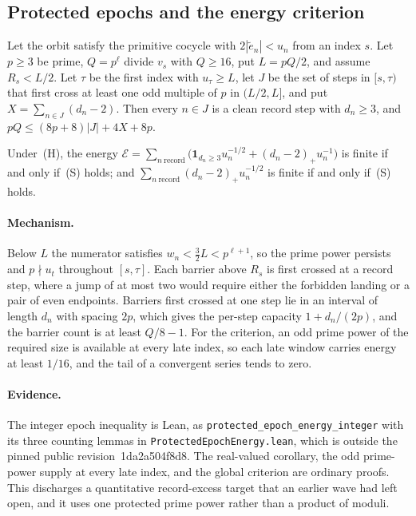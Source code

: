 \documentclass[11pt]{article}
\renewcommand{\commitshort}{1da2a504f8d8}
\begin{document}
\subsection{Protected epochs and the energy criterion}

\begin{theorem}\label{long243:res:epochenergy}
Let the orbit satisfy the primitive cocycle with $2|\tilde e_n|<u_n$ from an
index $s$.  Let $p\ge3$ be prime, $Q=p^{\ell}$ divide $v_s$ with $Q\ge16$, put
$L=pQ/2$, and assume $R_s<L/2$.  Let $\tau$ be the first index with $u_\tau\ge
L$, let $J$ be the set of steps in $[s,\tau)$ that first cross at least one odd
multiple of $p$ in $(L/2,L]$, and put $X=\sum_{n\in J}(d_n-2)$.  Then every
$n\in J$ is a clean record step with $d_n\ge3$, and
$pQ\le(8p+8)\lvert J\rvert+4X+8p$.
\end{theorem}

\begin{theorem}\label{long243:res:energycriterion}
Under~(H), the energy
$\mathcal E=\sum_{n\ \mathrm{record}}\bigl(\mathbf 1_{d_n\ge3}u_n^{-1/2}
+(d_n-2)_+u_n^{-1}\bigr)$ is finite if and only if~(S) holds; and
$\sum_{n\ \mathrm{record}}(d_n-2)_+u_n^{-1/2}$ is finite if and only if~(S)
holds.
\end{theorem}

\paragraph{Mechanism.}
Below $L$ the numerator satisfies $w_n<\tfrac32L<p^{\ell+1}$, so the prime power
persists and $p\nmid u_t$ throughout $[s,\tau]$.  Each barrier above $R_s$ is
first crossed at a record step, where a jump of at most two would require either
the forbidden landing or a pair of even endpoints.  Barriers first crossed at one
step lie in an interval of length $d_n$ with spacing $2p$, which gives the
per-step capacity $1+d_n/(2p)$, and the barrier count is at least $Q/8-1$.  For
the criterion, an odd prime power of the required size is available at every late
index, so each late window carries energy at least $1/16$, and the tail of a
convergent series tends to zero.

\paragraph{Evidence.}
The integer epoch inequality is Lean, as
\texttt{protected\_epoch\_energy\_integer} with its three counting lemmas in
\texttt{ProtectedEpochEnergy.lean}, which is outside the pinned public
revision~\commitshort.  The real-valued corollary, the odd prime-power supply at
every late index, and the global criterion are ordinary proofs.  This discharges
a quantitative record-excess target that an earlier wave had left open, and it
uses one protected prime power rather than a product of moduli.
\end{document}
